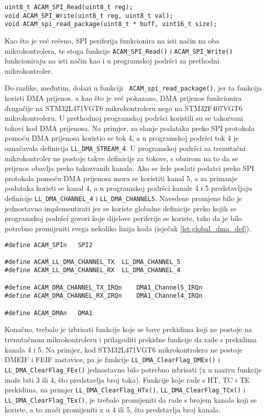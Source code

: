 \begin{lstlisting}[caption=Funkcije za rad s SPI periferijom, label={lst:acam_spi_functions}]
uint8_t ACAM_SPI_Read(uint8_t reg);
void ACAM_SPI_Write(uint8_t reg, uint8_t val);
void ACAM_spi_read_package(uint8_t * buff, uint16_t size);
\end{lstlisting}

\noindent Kao što je već rečeno, SPI periferija funkcionira na isti način na oba mikrokontrolera, te stoga funkcije \verb|ACAM_SPI_Read()| i \verb|ACAM_SPI_Write()| funkcioniraju na isti način kao i u programskoj podršci za prethodni mikrokontroler.

Do razlike, međutim, dolazi u funkciji \verb| ACAM_spi_read_package()|, jer ta funkcija koristi DMA prijenos, a kao što je već pokazano, DMA prijenos funkcionira drugačije na STM32L471VGT6 mikrokontroleru nego na STM32F407VGT6 mikrokontroleru. U prethodnoj programskoj podršci koristili su se takozvani tokovi kod DMA prijenosa. Na primjer, za slanje podataka preko SPI protokola pomoću DMA prijenosa koristio se tok 4, a u programskoj podršci tok 4 je označavala definicija \verb|LL_DMA_STREAM_4|. U programskoj podršci za trenutačni mikrokontroler ne postoje takve definicije za tokove, s obzirom na to da se prijenos obavlja preko takozvanih kanala. Ako se žele poslati podatci preko SPI protokola pomoću DMA prijenosa mora se koristiti kanal 5, a za primanje podataka koristi se kanal 4, a u programskoj podršci kanale 4 i 5 predstavljaju definicije \verb|LL_DMA_CHANNEL_4| i \verb|LL_DMA_CHANNEL5|. Navedene promjene bilo je jednostavno implementirati jer se koriste globalne definicije preko kojih se programskoj podršci govori koje dijelove periferije se koriste, tako da je bilo potrebno promijeniti svega nekoliko linija koda (isječak \ref{lst:global_dma_def}).
\begin{lstlisting}[caption=Zaglavlje dma.h datoteke u kojima se definira koji dijelovi periferija se koriste, label={lst:global_dma_def}]
#define ACAM_SPIn	SPI2

#define ACAM_LL_DMA_CHANNEL_TX	LL_DMA_CHANNEL_5
#define ACAM_LL_DMA_CHANNEL_RX	LL_DMA_CHANNEL_4

#define ACAM_DMA_CHANNEL_TX_IRQn	DMA1_Channel5_IRQn
#define ACAM_DMA_CHANNEL_RX_IRQn	DMA1_Channel4_IRQn

#define ACAM_DMAn	DMA1
\end{lstlisting}

Konačno, trebalo je izbrisati funkcije koje se bave prekidima koji ne postoje na trenutačnom mikrokontroleru i prilagoditi prekidne funkcije da rade s prekidima kanala 4 i 5. Na primjer, kod STM32L471VGT6 mikrokontrolera ne postoje DMEIF i FEIF zastavice, pa je funkcije \verb|LL_DMA_ClearFlag_DMEx()| i \\ \verb|LL_DMA_ClearFlag_FEx()| jednostavno bilo potrebno izbrisati (x u nazivu funkcije može biti 3 ili 4, što predstavlja broj toka). Funkcije koje rade s HT, TC i TE prekidima, na primjer \verb|LL_DMA_ClearFlag_HTx()|, \verb|LL_DMA_ClearFlag_TCx()| i \\ \verb|LL_DMA_ClearFlag_TEx()|, je trebalo promijeniti da rade s brojem kanala koji se koriste, a to znači promijeniti x u 4 ili 5, što predstavlja broj kanala.


